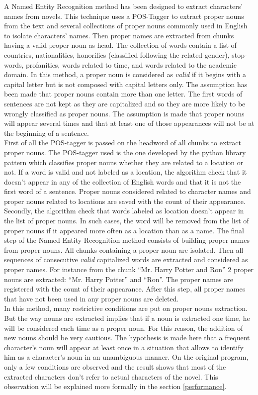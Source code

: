 \documentclass[a4paper, 12pt]{report}
\begin{document}
A Named Entity Recognition method has been designed to extract characters' names from novels.
This technique uses a POS-Tagger to extract proper nouns from the text and several collections of proper nouns commonly used in English to isolate characters' names.
Then proper names are extracted from chunks having a valid proper noun as head.
The collection of words contain a list of countries, nationalities, honorifics (classified following the related gender), stop-words, profanities,
words related to time, and words related to the academic domain.
In this method, a proper noun is considered as \textit{valid} if it begins with a capital letter but is not composed with capital letters only.
The assumption has been made that proper nouns contain more than one letter.
The first words of sentences are not kept as they are capitalized and so they are more likely to be wrongly classified as proper nouns.
The assumption is made that proper nouns will appear several times and that at least one of those appearances will not be at the beginning of a sentence.\\

First of all the POS-tagger is passed on the headword of all chunks to extract proper nouns.
The POS-tagger used is the one developed by the python library pattern which classifies proper nouns whether they are related to a location or not.
If a word is valid and not labeled as a location, the algorithm check that it doesn't appear in any of the collection of English words and that
it is not the first word of a sentence. Proper nouns considered related to character names and proper nouns related to locations are saved with the count of their appearance.
Secondly, the algorithm check that words labeled as location doesn't appear in the list of proper nouns.
In such cases, the word will be removed from the list of proper nouns if it appeared more often as a location than as a name.
The final step of the Named Entity Recognition method consists of building proper names from proper nouns.
All chunks containing a proper noun are isolated.
Then all sequences of consecutive  \textit{valid} capitalized words are extracted and considered as proper names. 
For instance from the chunk ``Mr. Harry Potter and Ron'' 2 proper nouns are extracted: ``Mr. Harry Potter'' and ``Ron''.
The proper names are registered with the count of their appearance. After this step, all proper names that have not been used in any proper nouns are deleted.\\

In this method, many restrictive conditions are put on proper nouns extraction.
But the way nouns are extracted implies that if a noun is extracted one time, he will be considered each time as a proper noun.
For this reason, the addition of new nouns should be very cautious.
The hypothesis is made here that a frequent character's noun will appear at least once in a situation that allows to identify him as a character's noun in an unambiguous manner.
On the original program, only a few conditions are observed and the result shows that most of the extracted characters don't refer to actual characters of the novel.
This observation will be explained more formally in the section \ref{performance}.
\end{document}
